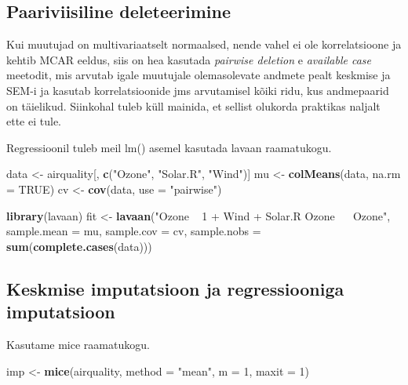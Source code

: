 \documentclass[]{book}
\newenvironment{Shaded}{\begin{snugshade}}{\end{snugshade}}
\newcommand{\DataTypeTok}[1]{\textcolor[rgb]{0.13,0.29,0.53}{#1}}
\newcommand{\DecValTok}[1]{\textcolor[rgb]{0.00,0.00,0.81}{#1}}
\newcommand{\KeywordTok}[1]{\textcolor[rgb]{0.13,0.29,0.53}{\textbf{#1}}}
\newcommand{\NormalTok}[1]{#1}
\newcommand{\OtherTok}[1]{\textcolor[rgb]{0.56,0.35,0.01}{#1}}
\newcommand{\StringTok}[1]{\textcolor[rgb]{0.31,0.60,0.02}{#1}}
\begin{document}
\hypertarget{paariviisiline-deleteerimine}{%
\subsection{Paariviisiline deleteerimine}\label{paariviisiline-deleteerimine}}

Kui muutujad on multivariaatselt normaalsed, nende vahel ei ole korrelatsioone ja kehtib MCAR eeldus, siis on hea kasutada \emph{pairwise deletion} e \emph{available case} meetodit, mis arvutab igale muutujale olemasolevate andmete pealt keskmise ja SEM-i ja kasutab korrelatsioonide jms arvutamisel kõiki ridu, kus andmepaarid on täielikud. Siinkohal tuleb küll mainida, et sellist olukorda praktikas naljalt ette ei tule.

Regressioonil tuleb meil lm() asemel kasutada lavaan raamatukogu.

\begin{Shaded}
\begin{Highlighting}[]
\NormalTok{data <-}\StringTok{ }\NormalTok{airquality[, }\KeywordTok{c}\NormalTok{(}\StringTok{"Ozone"}\NormalTok{, }\StringTok{"Solar.R"}\NormalTok{, }\StringTok{"Wind"}\NormalTok{)]}
\NormalTok{mu <-}\StringTok{ }\KeywordTok{colMeans}\NormalTok{(data, }\DataTypeTok{na.rm =} \OtherTok{TRUE}\NormalTok{)}
\NormalTok{cv <-}\StringTok{ }\KeywordTok{cov}\NormalTok{(data, }\DataTypeTok{use =} \StringTok{"pairwise"}\NormalTok{)}

\KeywordTok{library}\NormalTok{(lavaan)}
\NormalTok{fit <-}\StringTok{ }\KeywordTok{lavaan}\NormalTok{(}\StringTok{"Ozone ~ 1 + Wind + Solar.R}
\StringTok{              Ozone ~~ Ozone"}\NormalTok{,}
             \DataTypeTok{sample.mean =}\NormalTok{ mu, }\DataTypeTok{sample.cov =}\NormalTok{ cv,}
             \DataTypeTok{sample.nobs =} \KeywordTok{sum}\NormalTok{(}\KeywordTok{complete.cases}\NormalTok{(data)))}
\end{Highlighting}
\end{Shaded}

\hypertarget{keskmise-imputatsioon-ja-regressiooniga-imputatsioon}{%
\subsection{Keskmise imputatsioon ja regressiooniga imputatsioon}\label{keskmise-imputatsioon-ja-regressiooniga-imputatsioon}}

Kasutame mice raamatukogu.

\begin{Shaded}
\begin{Highlighting}[]
\NormalTok{imp <-}\StringTok{ }\KeywordTok{mice}\NormalTok{(airquality, }\DataTypeTok{method =} \StringTok{"mean"}\NormalTok{, }\DataTypeTok{m =} \DecValTok{1}\NormalTok{, }\DataTypeTok{maxit =} \DecValTok{1}\NormalTok{)}
\end{Highlighting}
\end{Shaded}
\end{document}
